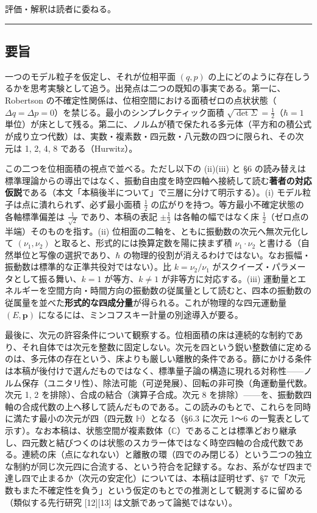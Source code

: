 \documentclass[
]{ltjsarticle}
\begin{document}
評価・解釈は読者に委ねる。

\begin{center}\rule{0.5\linewidth}{0.5pt}\end{center}

\subsection{要旨}\label{ux8981ux65e8}

一つのモデル粒子を仮定し、それが位相平面 \((q,p)\)
の上にどのように存在しうるかを思考実験として追う。出発点は二つの既知の事実である。第一に、Robertson
の不確定性関係は、位相空間における面積ゼロの点状状態（\(\Delta q=\Delta p=0\)）を禁じる。最小のシンプレクティック面積
\(\sqrt{\det\Sigma}=\tfrac12\)（\(\hbar=1\)
単位）が床として残る。第二に、ノルムが積で保たれる多元体（平方和の積公式が成り立つ代数）は、実数・複素数・四元数・八元数の四つに限られ、その次元は
1, 2, 4, 8 である（Hurwitz）。

この二つを位相面積の視点で並べる。ただし以下の (ii)(iii) と §6
の読み替えは標準理論からの導出ではなく、振動自由度を時空四軸へ接続して読む\textbf{著者の対応仮説}である（本文「本稿後半について」で三層に分けて明示する）。(i)
モデル粒子は点に潰れられず、必ず最小面積 \(\tfrac12\)
の広がりを持つ。等方最小不確定状態の各軸標準偏差は \(\tfrac{1}{\sqrt2}\)
であり、本稿の表記 \(\pm\tfrac12\) は各軸の幅ではなく床
\(\tfrac12\)（ゼロ点の半端）そのものを指す。(ii)
位相面の二軸を、ともに振動数の次元へ無次元化して \((\nu_1,\nu_2)\)
と取ると、形式的には換算定数を陽に挟まず積 \(\nu_1\cdot\nu_2\)
と書ける（自然単位と写像の選択であり、\(\hbar\)
の物理的役割が消えるわけではない。なお振幅・振動数は標準的な正準共役対ではない）。比
\(k=\nu_2/\nu_1\) がスクイーズ・パラメータとして振る舞い、\(k=1\)
が等方、\(k\neq1\) が非等方に対応する。(iii)
運動量とエネルギーを空間方向・時間方向の振動数の従属量として読むと、四本の振動数の従属量を並べた\textbf{形式的な四成分量}が得られる。これが物理的な四元運動量
\((E,\boldsymbol{p})\) になるには、ミンコフスキー計量の別途導入が要る。

最後に、次元の許容条件について観察する。位相面積の床は連続的な制約であり、それ自体では次元を整数に固定しない。次元を四という鋭い整数値に定めるのは、多元体の存在という、床よりも厳しい離散的条件である。篩にかける条件は本稿が後付けで選んだものではなく、標準量子論の構造に現れる対称性------ノルム保存（ユニタリ性）、除法可能（可逆発展）、回転の非可換（角運動量代数。次元
1, 2 を排除）、合成の結合（演算子合成。次元 8
を排除）------を、振動数四軸の合成代数の上へ移して読んだものである。この読みのもとで、これらを同時に満たす最小の次元が四（四元数
\(\mathbb{H}\)）となる（§6.3 に次元 1〜6
の一覧表として示す）。なお本稿は、状態空間が複素数体（\(\mathbb{C}\)）であることは標準どおり継承し、四元数と結びつくのは状態のスカラー体ではなく時空四軸の合成代数である。連続の床（点になれない）と離散の環（四でのみ閉じる）という二つの独立な制約が同じ次元四に合流する、という符合を記録する。なお、系がなぜ四まで達し四で止まるか（次元の安定化）については、本稿は証明せず、§7
で「次元数もまた不確定性を負う」という仮定のもとでの推測として観測するに留める（類似する先行研究
{[}12{]}{[}13{]} は文脈であって論拠ではない）。
\end{document}
